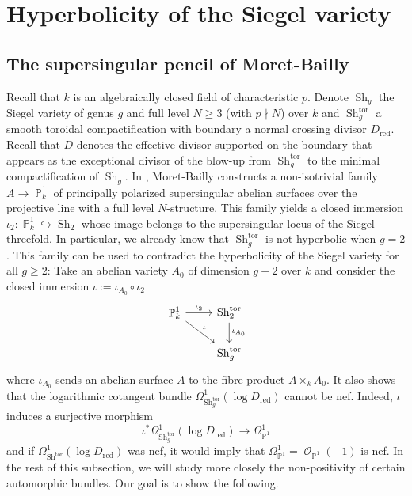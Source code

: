 \documentclass[11pt]{amsart}
\numberwithin{subsection}{section}
\numberwithin{figure}{section}
\numberwithin{table}{section}
\theoremstyle{1}
\theoremstyle{2}
\DeclareMathOperator{\Sh}{Sh}
\DeclareMathOperator{\tor}{tor}
\DeclareMathOperator{\Oc}{\mathcal{O}}
\DeclareMathOperator{\Pb}{\mathbb{P}}
\DeclareMathOperator{\red}{red}
\begin{document}
\section{Hyperbolicity of the Siegel variety}\label{sect_hyp}
\subsection{The supersingular pencil of Moret-Bailly}
Recall that $k$ is an algebraically closed field of characteristic $p$. Denote $\Sh_g$ the Siegel variety of genus $g$ and full level $N \geq 3$ (with $p \nmid N$) over $k$ and $\Sh_g^{\tor}$ a smooth toroidal compactification with boundary a normal crossing divisor $D_{\red}$. Recall that $D$ denotes the effective divisor supported on the boundary that appears as the exceptional divisor of the blow-up from $\Sh_g^{\tor}$ to the minimal compactification of $\Sh_g$. In \cite{MR3618576}, Moret-Bailly constructs a non-isotrivial family $A \rightarrow \Pb^1_{k}$ of principally polarized supersingular abelian surfaces over the projective line with a full level $N$-structure. This family yields a closed immersion $\iota_2 : \Pb_k^1\hookrightarrow \Sh_2$ whose image belongs to the supersingular locus of the Siegel threefold. In particular, we already know that $\Sh_g^{\tor}$ is not hyperbolic when $g = 2$. This family can be used to contradict the hyperbolicity of the Siegel variety for all $g\geq 2$: Take an abelian variety $A_0$ of dimension $g-2$ over $k$ and consider the closed immersion $\iota := \iota_{A_0} \circ \iota_2$
\begin{equation*}
\begin{tikzcd}
\Pb^1_{k} \arrow[rd,"\iota"] \arrow[r,"\iota_2"] & \Sh_{2}^{\tor} \arrow[d,"\iota_{A_0}"] \\
& \Sh_{g}^{\tor} 
\end{tikzcd}
\end{equation*}
where $\iota_{A_0}$ sends an abelian surface $A$ to the fibre product $A \times_{k} A_0$. It also shows that the logarithmic cotangent bundle $\Omega^1_{\Sh_g^{\tor}}(\log D_{\red})$ cannot be nef. Indeed, $\iota$ induces a surjective morphism
\begin{equation*}
\iota^*\Omega^1_{\Sh_g^{\tor}}(\log D_{\red}) \rightarrow \Omega^1_{\Pb^1}
\end{equation*}
and if $\Omega^1_{\Sh^{\tor}}(\log D_{\red})$ was nef, it would imply that $\Omega^1_{\Pb^1} = \Oc_{\Pb^1}(-1)$ is nef. In the rest of this subsection, we will study more closely the non-positivity of certain automorphic bundles. Our goal is to show the following.
\end{document}
